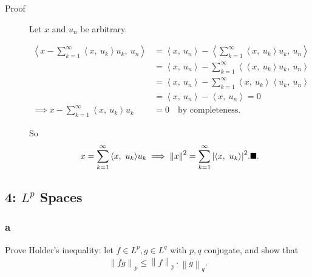 \begin{description}
\item[Proof]
Let \(x\) and \(u_n\) be arbitrary.

\begin{align*} {\left\langle {x - \sum_{k=1}^\infty {\left\langle {x},~{u_k} \right\rangle}u_k },~{u_n} \right\rangle} &= {\left\langle {x},~{u_n} \right\rangle} - {\left\langle {\sum_{k=1}^\infty {\left\langle {x},~{u_k} \right\rangle}u_k },~{u_n} \right\rangle} \\ &= {\left\langle {x},~{u_n} \right\rangle} - \sum_{k=1}^\infty  {\left\langle {{\left\langle {x},~{u_k} \right\rangle}u_k },~{u_n} \right\rangle} \\ &= {\left\langle {x},~{u_n} \right\rangle} - \sum_{k=1}^\infty  {\left\langle {x},~{u_k} \right\rangle} {\left\langle {u_k },~{u_n} \right\rangle} \\ &= {\left\langle {x},~{u_n} \right\rangle} - {\left\langle {x},~{u_n} \right\rangle} = 0 \\ \implies  x - \sum_{k=1}^\infty {\left\langle {x},~{u_k} \right\rangle}u_k &= 0 \quad\text{by completeness} .\end{align*}

So
\begin{align*} x = \sum_{k=1}^\infty {\left\langle {x},~{u_k} \right\rangle} u_k \implies {\left\lVert {x} \right\rVert}^2 = \sum_{k=1}^\infty {\left\lvert {{\left\langle {x},~{u_k} \right\rangle}} \right\rvert}^2. \hfill\blacksquare .\end{align*}
\end{description}

\hypertarget{lp-spaces}{%
\subsection{\texorpdfstring{4: \(L^p\)
Spaces}{4: L\^{}p Spaces}}\label{lp-spaces}}

\hypertarget{a-3}{%
\subsubsection{a}\label{a-3}}

Prove Holder's inequality: let \(f\in L^p, g\in L^q\) with \(p, q\)
conjugate, and show that
\begin{align*} {\left\lVert {fg} \right\rVert}_{p} \leq {\left\lVert {f} \right\rVert}_{p} \cdot {\left\lVert {g} \right\rVert}_{q} .\end{align*}

